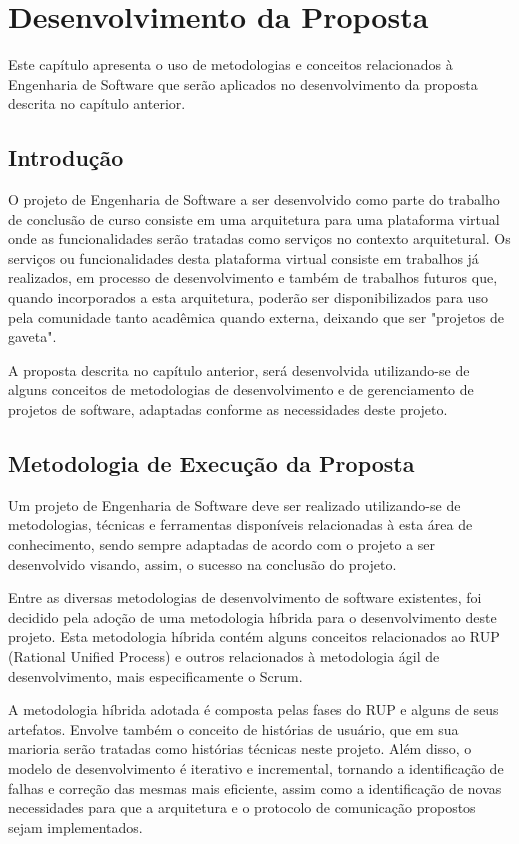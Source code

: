 \chapter[Desenvolvimento da Proposta]{Desenvolvimento da Proposta}

Este capítulo apresenta o uso de metodologias e conceitos relacionados à Engenharia de Software que serão aplicados no desenvolvimento da proposta descrita no capítulo anterior.

\section{Introdução}
O projeto de Engenharia de Software a ser desenvolvido como parte do trabalho de conclusão de curso consiste em uma arquitetura para uma plataforma virtual onde as funcionalidades serão tratadas como serviços no contexto arquitetural. Os serviços ou funcionalidades desta plataforma virtual consiste em trabalhos já realizados, em processo de desenvolvimento e também de trabalhos futuros que, quando incorporados a esta arquitetura, poderão ser disponibilizados para uso pela comunidade tanto acadêmica quando externa, deixando que ser "projetos de gaveta".

A proposta descrita no capítulo anterior, será desenvolvida utilizando-se de alguns conceitos de metodologias de desenvolvimento e de gerenciamento de projetos de software, adaptadas conforme as necessidades deste projeto.

\section{Metodologia de Execução da Proposta}
Um projeto de Engenharia de Software deve ser realizado utilizando-se de metodologias, técnicas e ferramentas disponíveis relacionadas à esta área de conhecimento, sendo sempre adaptadas de acordo com o projeto a ser desenvolvido visando, assim, o sucesso na conclusão do projeto.

Entre as diversas metodologias de desenvolvimento de software existentes, foi decidido pela adoção de uma metodologia híbrida para o desenvolvimento deste projeto. Esta metodologia híbrida contém alguns conceitos relacionados ao RUP (Rational Unified Process) e outros relacionados à metodologia ágil de desenvolvimento, mais especificamente o Scrum. 

A metodologia híbrida adotada é composta pelas fases do RUP e alguns de seus artefatos. Envolve também o conceito de histórias de usuário, que em sua marioria serão tratadas como histórias técnicas  neste projeto. Além disso, o modelo de desenvolvimento é iterativo e incremental, tornando a identificação de falhas e correção das mesmas mais eficiente, assim como a identificação de novas necessidades para que a arquitetura e o protocolo de comunicação propostos sejam implementados.

